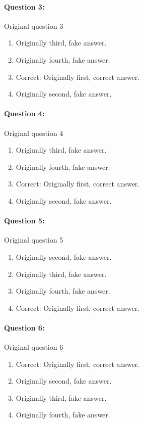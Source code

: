 \documentclass[9pt, twoside, twocolumn]{extarticle}
\begin{document}
\paragraph{Question 3:}
Original question 3

\begin{enumerate}[label=\textbf{{\Alph*}},labelindent=0pt, labelsep=1.5em, parsep=0.2em]
\item Originally third, fake answer.
\item Originally fourth, fake answer.
\item Correct: Originally first, correct answer.
\item Originally second, fake answer.
\end{enumerate}
\paragraph{Question 4:}
Original question 4

\begin{enumerate}[label=\textbf{{\Alph*}},labelindent=0pt, labelsep=1.5em, parsep=0.2em]
\item Originally third, fake answer.
\item Originally fourth, fake answer.
\item Correct: Originally first, correct answer.
\item Originally second, fake answer.
\end{enumerate}
\paragraph{Question 5:}
Original question 5

\begin{enumerate}[label=\textbf{{\Alph*}},labelindent=0pt, labelsep=1.5em, parsep=0.2em]
\item Originally second, fake answer.
\item Originally third, fake answer.
\item Originally fourth, fake answer.
\item Correct: Originally first, correct answer.
\end{enumerate}
\paragraph{Question 6:}
Original question 6

\begin{enumerate}[label=\textbf{{\Alph*}},labelindent=0pt, labelsep=1.5em, parsep=0.2em]
\item Correct: Originally first, correct answer.
\item Originally second, fake answer.
\item Originally third, fake answer.
\item Originally fourth, fake answer.
\end{enumerate}
\end{document}
